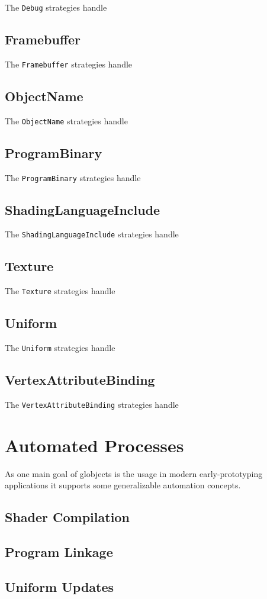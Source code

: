 \documentclass{article}
\begin{document}
The \verb|Debug| strategies handle

\subsection{Framebuffer}

The \verb|Framebuffer| strategies handle

\subsection{ObjectName}

The \verb|ObjectName| strategies handle

\subsection{ProgramBinary}

The \verb|ProgramBinary| strategies handle

\subsection{ShadingLanguageInclude}

The \verb|ShadingLanguageInclude| strategies handle

\subsection{Texture}

The \verb|Texture| strategies handle

\subsection{Uniform}

The \verb|Uniform| strategies handle

\subsection{VertexAttributeBinding}

The \verb|VertexAttributeBinding| strategies handle

\section{Automated Processes}

As one main goal of globjects is the usage in modern early-prototyping applications it supports some generalizable automation concepts.

\subsection{Shader Compilation}

 

\subsection{Program Linkage}



\subsection{Uniform Updates}
\end{document}
